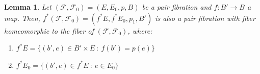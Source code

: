 \documentclass[12pt,oneside]{book}
\newtheorem{lem}    {Lemma}[chapter]
\begin{document}
    \begin{lem}\label{pf_pullback}
        Let $(\mathcal{F},\mathcal{F}_{0})=(E,E_{0},p,B)$ be a pair fibration and $f:B'\to B$ a map. Then, 
        $f^{*}(\mathcal{F},\mathcal{F}_{0})=(f^{*}E,f^{*}E_{0},p_{1},B')$ is also a pair fibration with fiber 
        homeomorphic to the fiber of $(\mathcal{F},\mathcal{F}_{0})$, where:
        
        \begin{enumerate}
            \item $f^{*}E=\{ (b',e)\in B'\times E \ : \ f(b')=p(e) \}$
            \item $f^{*}E_{0}=\{ (b',e)\in f^{*}E \ : \ e\in E_{0} \}$
        \end{enumerate}
    \end{lem}
    
\end{document}
